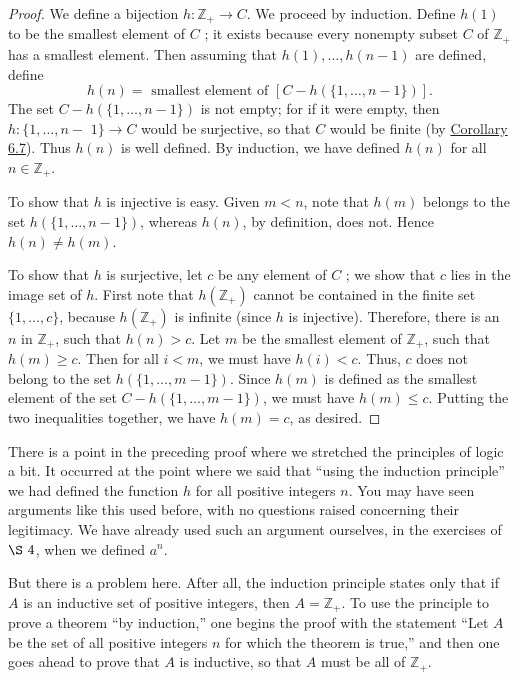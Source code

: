 \begin{proof}
 We define a bijection \(h : \mathbb{Z}_{+} \rightarrow C\). We proceed by induction. Define \(h(1)\) to be the smallest element of \(C\) ; it exists because every nonempty subset \(C\) of \(\mathbb{Z}_{+}\) has a smallest element. Then assuming that \(h(1),\ldots, h({n - 1})\) are defined, define
 \[
 h(n) = \text{ smallest element of }[{C - h({\{1,\ldots, n - 1\} }) }] .
 \]
 The set \(C - h({\{1,\ldots, n - 1\} })\) is not empty; for if it were empty, then \(h : \{1,\ldots, n -\) \(1\} \rightarrow C\) would be surjective, so that \(C\) would be finite (by \hyperref[cor:6.7]{Corollary 6.7}). Thus \(h(n)\) is well defined. By induction, we have defined \(h(n)\) for all \(n \in {\mathbb{Z}}_{+}\).

 To show that \(h\) is injective is easy. Given \(m < n\), note that \(h( m)\) belongs to the set \(h({\{1,\ldots, n - 1\} })\), whereas \(h(n)\), by definition, does not. Hence \(h(n) \neq h( m)\).

 To show that \(h\) is surjective, let \(c\) be any element of \(C\) ; we show that \(c\) lies in the image set of \(h\). First note that \(h(\mathbb{Z}_{+})\) cannot be contained in the finite set \(\{1,\ldots, c\}\), because \(h(\mathbb{Z}_{+})\) is infinite (since \(h\) is injective). Therefore, there is an \(n\) in \(\mathbb{Z}_{+}\), such that \(h(n) > c\). Let \(m\) be the smallest element of \(\mathbb{Z}_{+}\), such that \(h( m) \geq c\). Then for all \(i < m\), we must have \(h(i) < c\). Thus, \(c\) does not belong to the set \(h({\{1,\ldots, m - 1\} })\). Since \(h( m)\) is defined as the smallest element of the set \(C - h({\{1,\ldots, m - 1\} })\), we must have \(h( m) \leq c\). Putting the two inequalities together, we have \(h( m) = c\), as desired.
\end{proof}

There is a point in the preceding proof where we stretched the principles of logic a bit. It occurred at the point where we said that ``using the induction principle'' we had defined the function \(h\) for all positive integers \(n\). You may have seen arguments like this used before, with no questions raised concerning their legitimacy. We have already used such an argument ourselves, in the exercises of \(\S\ 4\), when we defined \(a^{n}\).

But there is a problem here. After all, the induction principle states only that if \(A\) is an inductive set of positive integers, then \(A = \mathbb{Z}_{+}\). To use the principle to prove a theorem ``by induction,'' one begins the proof with the statement ``Let \(A\) be the set of all positive integers \(n\) for which the theorem is true,'' and then one goes ahead to prove that \(A\) is inductive, so that \(A\) must be all of \(\mathbb{Z}_{+}\).

